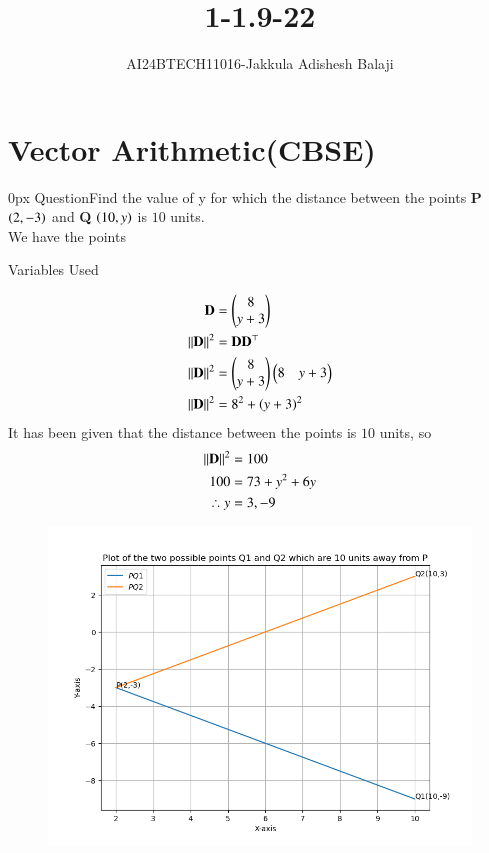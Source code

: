 \documentclass[journal]{IEEEtran}
\begin{document}

\renewcommand{\thefigure}{\theenumi}
\renewcommand{\thetable}{\theenumi}
\setlength{\intextsep}{10pt} %
\renewcommand{\thetable}{\theenumi}
\title{1-1.9-22}

\author{AI24BTECH11016-Jakkula Adishesh Balaji}
\maketitle
\bigskip
\section*{\textbf{Vector Arithmetic(CBSE)}}
         \parindent 0px
         QuestionFind the value of y for which the distance between the points \textbf{P} $\left(2,-3\right)$ and \textbf{Q} $\left(10,y\right)$ is $10$ units. \\
	We have the points \\
	\begin{table}[h!]
         	\centering
         	
         	\caption{Variables Used}
         	\label{tab1.9.22}
         \end{table}
         \begin{align}
         	\mathbf{D}	&= \begin{pmatrix}8\\y+3\end{pmatrix} \\
		\left\lVert\mathbf{D}\right\rVert^2 &= \mathbf{D}\mathbf{D}^\top \\
		\left\lVert\mathbf{D}\right\rVert^2 &= \begin{pmatrix}8\\y+3\end{pmatrix}\begin{pmatrix}8 & y+3\end{pmatrix} \\
		\left\lVert\mathbf{D}\right\rVert^2 &= 8^{2} + \left(y+3\right)^{2} \\
	\end{align}
	It has been given that the distance between the points is $10$ units, so \\
	\solution
	\begin{align}
	\left\lVert\mathbf{D}\right\rVert^2 &= 100 	 \\
       	100 &= 73 + y^{2} + 6y \\
 	\therefore y &= 3,-9 \\
	\end{align}
	\begin{figure}[h]
		\centering
		\includegraphics[scale=0.6]{figs/plot.png}
		\label{Fig}
	\end{figure}
\end{document}
